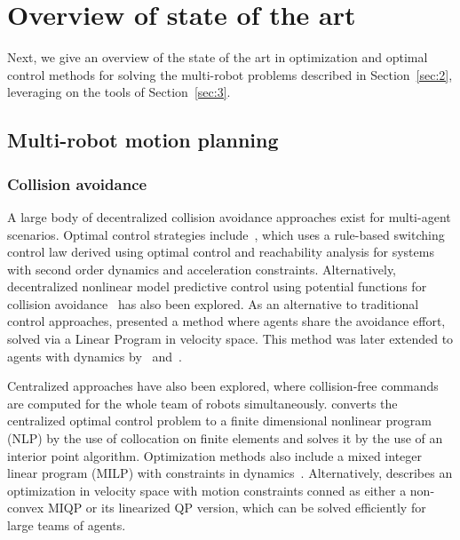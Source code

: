 
\section{Overview of state of the art}\label{sec:4}

Next, we give an overview of the state of the art in optimization and optimal control methods for solving the multi-robot problems described in Section~\ref{sec:2}, leveraging on the tools of Section~\ref{sec:3}.

\subsection{Multi-robot motion planning}

\subsubsection{Collision avoidance}
A large body of decentralized collision avoidance approaches exist for multi-agent scenarios.
Optimal control strategies include~\cite{Hoffmann:2008vl}, which uses a rule-based switching control law derived using optimal control and reachability analysis for systems with second order dynamics and acceleration constraints.
Alternatively, decentralized nonlinear model predictive control using potential functions for collision avoidance~\cite{Shim:2003ih} has also been explored.
As an alternative to traditional control approaches, \cite{vandenberg09} presented a method where agents share the avoidance effort, solved via a Linear Program in velocity space. This method was later extended to agents with dynamics by~\cite{snape09, alonsomora10dars, AlonsoMora:2014kb} and~\cite{alonsomora2015auro}.

Centralized approaches have also been explored, where collision-free commands are computed for the whole team of robots simultaneously.
\cite{Raghunathan:2004ga} converts the centralized optimal control problem to a finite dimensional nonlinear program (NLP) by the use of collocation on finite elements and solves it by the use of an interior point algorithm.
Optimization methods also include a mixed integer linear program (MILP) with constraints in dynamics~\cite{Kuwata:2007vq}. Alternatively, \cite{alonsomora13icra} describes an optimization in velocity space with motion constraints conned as either a non-convex MIQP or its linearized QP version, which can be solved efficiently for large teams of agents.

